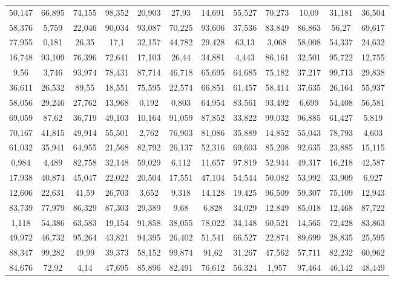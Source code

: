 \documentclass[12pt,ngerman]{standalone}
\begin{document}
\begin{tabular}{SSSSSSSSSSSS}
50,147	&	66,895	&	74,155	&	98,352	&	20,903	&	27,93	&	14,691	&	55,527	&	70,273	&	10,09	&	31,181	&	36,504	\\
58,376	&	5,759	&	22,046	&	90,034	&	93,087	&	70,225	&	93,606	&	37,536	&	83,849	&	86,863	&	56,27	&	69,617	\\
77,955	&	0,181	&	26,35	&	17,1	&	32,157	&	44,782	&	29,428	&	63,13	&	3,068	&	58,008	&	54,337	&	24,632	\\
16,748	&	93,109	&	76,396	&	72,641	&	17,103	&	26,44	&	34,881	&	4,443	&	86,161	&	32,501	&	95,722	&	12,755	\\
9,56	&	3,746	&	93,974	&	78,431	&	87,714	&	46,718	&	65,695	&	64,685	&	75,182	&	37,217	&	99,713	&	29,838	\\
36,611	&	26,532	&	89,55	&	18,551	&	75,595	&	22,574	&	66,851	&	61,457	&	58,414	&	37,635	&	26,164	&	55,937	\\
58,056	&	29,246	&	27,762	&	13,968	&	0,192	&	0,803	&	64,954	&	83,561	&	93,492	&	6,699	&	54,408	&	56,581	\\
69,059	&	87,62	&	36,719	&	49,103	&	10,164	&	91,059	&	87,852	&	33,822	&	99,032	&	96,885	&	61,427	&	5,819	\\
70,167	&	41,815	&	49,914	&	55,501	&	2,762	&	76,903	&	81,086	&	35,889	&	14,852	&	55,043	&	78,793	&	4,603	\\
61,032	&	35,941	&	64,955	&	21,568	&	82,792	&	26,137	&	52,316	&	69,603	&	85,208	&	92,635	&	23,885	&	15,115	\\
0,984	&	4,489	&	82,758	&	32,148	&	59,029	&	6,112	&	11,657	&	97,819	&	52,944	&	49,317	&	16,218	&	42,587	\\
17,938	&	40,874	&	45,047	&	22,022	&	20,504	&	17,551	&	47,104	&	54,544	&	50,082	&	53,992	&	33,909	&	6,927	\\
12,606	&	22,631	&	41,59	&	26,703	&	3,652	&	9,318	&	14,128	&	19,425	&	96,509	&	59,307	&	75,109	&	12,943	\\
83,739	&	77,979	&	86,329	&	87,303	&	29,389	&	9,68	&	6,828	&	34,029	&	12,849	&	85,018	&	12,468	&	87,722	\\
1,118	&	54,386	&	63,583	&	19,154	&	91,858	&	38,055	&	78,022	&	34,148	&	60,521	&	14,565	&	72,428	&	83,863	\\
49,972	&	46,732	&	95,264	&	43,821	&	94,395	&	26,402	&	51,541	&	66,527	&	22,874	&	89,699	&	28,835	&	25,595	\\
88,347	&	99,282	&	49,99	&	39,373	&	58,152	&	99,874	&	91,62	&	31,267	&	47,562	&	57,711	&	82,232	&	60,962	\\
84,676	&	72,92	&	4,14	&	47,695	&	85,896	&	82,491	&	76,612	&	56,324	&	1,957	&	97,464	&	46,142	&	48,449	\\

\end{tabular}
\end{document}
